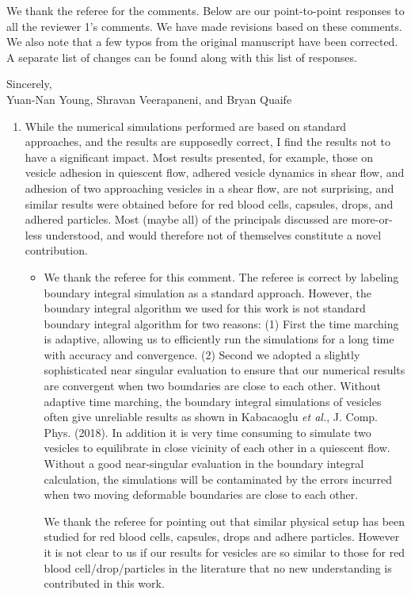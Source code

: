 \documentclass[11pt]{article}
\newcommand{\comment}[1]{{\color{blue} #1}}
\begin{document}
\noindent
We thank the referee for the comments.  Below are our point-to-point responses to 
all the reviewer 1's comments.  We have made revisions based on these comments.
We also note that a few typos from the original manuscript have
been corrected.  A separate list of changes can be found along with this list of responses.


\noindent 
Sincerely, \\ \noindent
Yuan-Nan Young, Shravan Veerapaneni, and Bryan Quaife

\vspace{20pt}
\noindent

\begin{enumerate}
\item\comment{While the numerical simulations performed are based on standard
approaches, and the results are supposedly correct, I find the results
not to have a significant impact. Most results presented, for example,
those on vesicle adhesion in quiescent flow, adhered vesicle dynamics in
shear flow, and adhesion of two approaching vesicles in a shear flow,
are not surprising, and similar results were obtained before for red
blood cells, capsules, drops, and adhered particles. Most (maybe all) of
the principals discussed are more-or-less understood, and would
therefore not of themselves constitute a novel contribution.}
\begin{itemize}
  \item We thank the referee for this comment. The referee is correct by labeling boundary integral simulation as a standard approach.
  However, the boundary integral algorithm we used for this work is not standard boundary integral algorithm for two reasons: (1) First the time marching is adaptive, allowing us to efficiently run the simulations for a long time with accuracy and convergence. (2) Second we adopted a slightly sophisticated near singular evaluation to ensure that our numerical results are convergent when two boundaries are close to each other. Without adaptive time marching, the boundary integral simulations of vesicles often give unreliable results as shown in
Kabacaoglu {\it et al.}, J. Comp. Phys. (2018). In addition it is very time consuming to simulate two vesicles to equilibrate in close vicinity of each other in a quiescent flow. 
Without a good near-singular evaluation in the boundary integral calculation, the simulations will be contaminated by the errors incurred when two moving deformable boundaries are close to each other.
  
  We thank the referee for pointing out that similar physical setup has been studied for red blood cells, capsules, drops and adhere particles. 
  However it is not clear to us if our results for vesicles are so similar to those for red blood cell/drop/particles in the literature that no new understanding is contributed in this work.
  

\end{itemize}
\end{enumerate}
\end{document}
